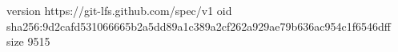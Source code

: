 version https://git-lfs.github.com/spec/v1
oid sha256:9d2cafd531066665b2a5dd89a1c389a2cf262a929ae79b636ac954c1f6546dff
size 9515
